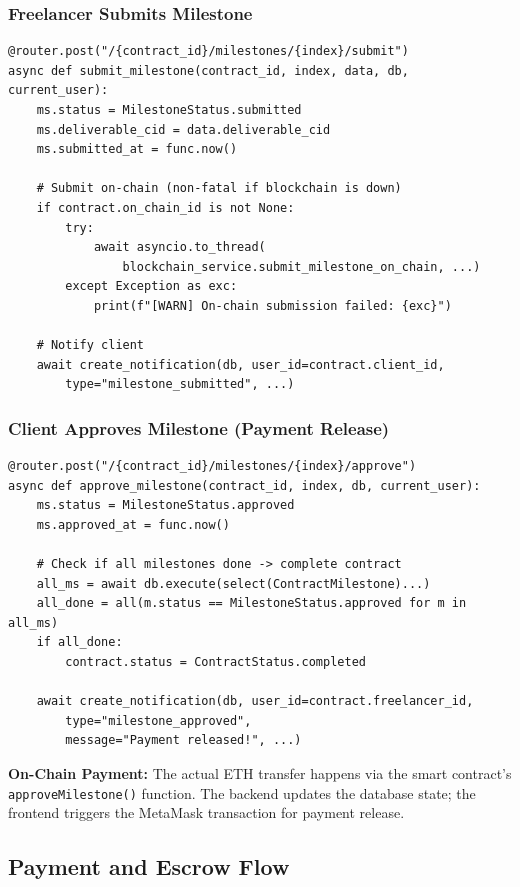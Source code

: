 \documentclass[12pt,a4paper]{article}
\begin{document}
\subsubsection{Freelancer Submits Milestone}
\begin{lstlisting}[style=pythonstyle]
@router.post("/{contract_id}/milestones/{index}/submit")
async def submit_milestone(contract_id, index, data, db, current_user):
    ms.status = MilestoneStatus.submitted
    ms.deliverable_cid = data.deliverable_cid
    ms.submitted_at = func.now()

    # Submit on-chain (non-fatal if blockchain is down)
    if contract.on_chain_id is not None:
        try:
            await asyncio.to_thread(
                blockchain_service.submit_milestone_on_chain, ...)
        except Exception as exc:
            print(f"[WARN] On-chain submission failed: {exc}")

    # Notify client
    await create_notification(db, user_id=contract.client_id,
        type="milestone_submitted", ...)
\end{lstlisting}

\subsubsection{Client Approves Milestone (Payment Release)}
\begin{lstlisting}[style=pythonstyle]
@router.post("/{contract_id}/milestones/{index}/approve")
async def approve_milestone(contract_id, index, db, current_user):
    ms.status = MilestoneStatus.approved
    ms.approved_at = func.now()

    # Check if all milestones done -> complete contract
    all_ms = await db.execute(select(ContractMilestone)...)
    all_done = all(m.status == MilestoneStatus.approved for m in all_ms)
    if all_done:
        contract.status = ContractStatus.completed

    await create_notification(db, user_id=contract.freelancer_id,
        type="milestone_approved",
        message="Payment released!", ...)
\end{lstlisting}

\textbf{On-Chain Payment:} The actual ETH transfer happens via the smart contract's \texttt{approveMilestone()} function. The backend updates the database state; the frontend triggers the MetaMask transaction for payment release.

\subsection{Payment and Escrow Flow}
\end{document}
